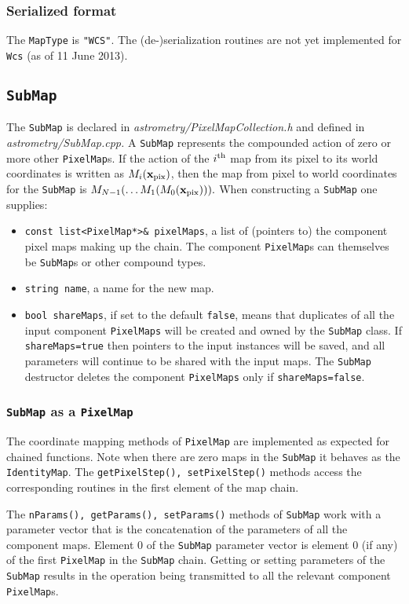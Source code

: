 \documentclass[11pt,preprint,flushrt]{aastex}
\begin{document}
\subsubsection{Serialized  format}
The {\tt MapType} is {\tt "WCS"}.
The (de-)serialization routines are not yet implemented for {\tt Wcs} (as of 11 June 2013).

\subsection{\tt SubMap}
The {\tt SubMap} is declared in {\it astrometry/PixelMapCollection.h} and defined in {\it astrometry/SubMap.cpp.}
A {\tt SubMap} represents the compounded action of zero or more other {\tt PixelMap}s.  If the action of the $i^{\rm th}$ map from its pixel to its world coordinates is written as $M_i({\bf x}_{\rm pix})$, then the map from pixel to world coordinates for the {\tt SubMap} is $M_{N-1}(\ldots M_1(M_0({\bf x}_{\rm pix}))).$ When constructing a {\tt SubMap} one supplies:
\begin{itemize}
\item {\tt const list<PixelMap*>\& pixelMaps}, a list of (pointers to) the component pixel maps making up the chain.  The component {\tt PixelMap}s can themselves be {\tt SubMap}s or other compound types.
\item {\tt string name}, a name for the new map.
\item {\tt bool shareMaps}, if set to the default {\tt false}, means that duplicates of all the input component {\tt PixelMaps} will be created and owned by the {\tt SubMap} class.  If {\tt shareMaps=true} then pointers to the input instances will be saved, and all parameters will continue to be shared with the input maps.  The {\tt SubMap} destructor deletes the component {\tt PixelMaps} only if {\tt shareMaps=false}.
\end{itemize}

\subsubsection{{\tt SubMap} as a {\tt PixelMap}}
The coordinate mapping methods of {\tt PixelMap} are implemented as expected for chained functions.  Note when there are zero maps in the {\tt SubMap} it behaves as the {\tt IdentityMap}.  The {\tt getPixelStep(), setPixelStep()} methods access the corresponding routines in the first element of the map chain.

The {\tt nParams(), getParams(), setParams()} methods of {\tt SubMap} work with a parameter vector that is the concatenation of the parameters of all the component maps.  Element 0 of the {\tt SubMap} parameter vector is element 0 (if any) of the first {\tt PixelMap} in the {\tt SubMap} chain.  Getting or setting parameters of the {\tt SubMap} results in the operation being transmitted to all the relevant component {\tt PixelMap}s.
\end{document}
